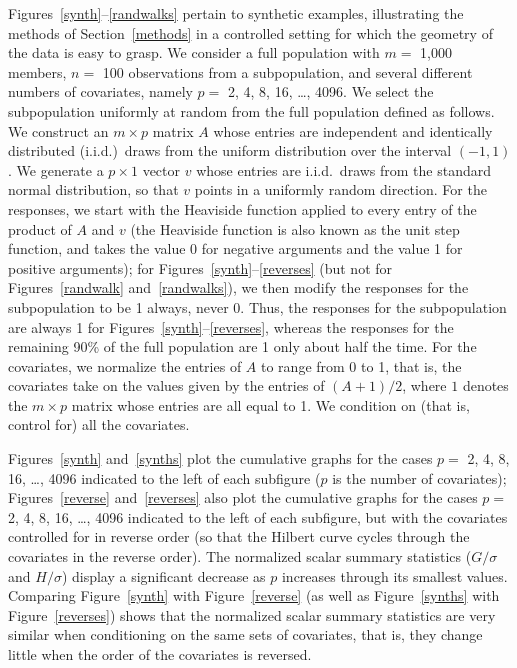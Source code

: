 \documentclass{article}
\begin{document}
Figures~\ref{synth}--\ref{randwalks} pertain to synthetic examples,
illustrating the methods of Section~\ref{methods}
in a controlled setting for which the geometry of the data is easy to grasp.
We consider a full population with $m =$ 1,000 members,
$n =$ 100 observations from a subpopulation,
and several different numbers of covariates,
namely $p =$ 2, 4, 8, 16, \dots, 4096.
We select the subpopulation uniformly at random
from the full population defined as follows.
We construct an $m \times p$ matrix $A$ whose entries
are independent and identically distributed (i.i.d.)\ draws
from the uniform distribution over the interval $(-1, 1)$.
We generate a $p \times 1$ vector $v$ whose entries are i.i.d.\ draws
from the standard normal distribution, so that $v$ points
in a uniformly random direction.
For the responses, we start with the Heaviside function applied
to every entry of the product of $A$ and $v$
(the Heaviside function is also known as the unit step function,
and takes the value 0 for negative arguments and the value 1
for positive arguments); for Figures~\ref{synth}--\ref{reverses}
(but not for Figures~\ref{randwalk} and~\ref{randwalks}),
we then modify the responses for the subpopulation to be 1 always, never 0.
Thus, the responses for the subpopulation are always 1
for Figures~\ref{synth}--\ref{reverses},
whereas the responses for the remaining 90\% of the full population
are 1 only about half the time.
For the covariates, we normalize the entries of $A$ to range from 0 to 1,
that is, the covariates take on the values given by the entries
of $(A+1)/2$, where $1$ denotes the $m \times p$ matrix
whose entries are all equal to 1.
We condition on (that is, control for) all the covariates.

Figures~\ref{synth} and~\ref{synths} plot the cumulative graphs
for the cases $p =$ 2, 4, 8, 16, \dots, 4096 indicated to the left
of each subfigure ($p$ is the number of covariates);
Figures~\ref{reverse} and~\ref{reverses} also plot the cumulative graphs
for the cases $p =$ 2, 4, 8, 16, \dots, 4096 indicated to the left
of each subfigure, but with the covariates controlled for in reverse order
(so that the Hilbert curve cycles through the covariates in the reverse order).
The normalized scalar summary statistics ($G/\sigma$ and $H/\sigma$)
display a significant decrease as $p$ increases through its smallest values.
Comparing Figure~\ref{synth} with Figure~\ref{reverse}
(as well as Figure~\ref{synths} with Figure~\ref{reverses})
shows that the normalized scalar summary statistics
are very similar when conditioning on the same sets of covariates, that is,
they change little when the order of the covariates is reversed.
\end{document}
